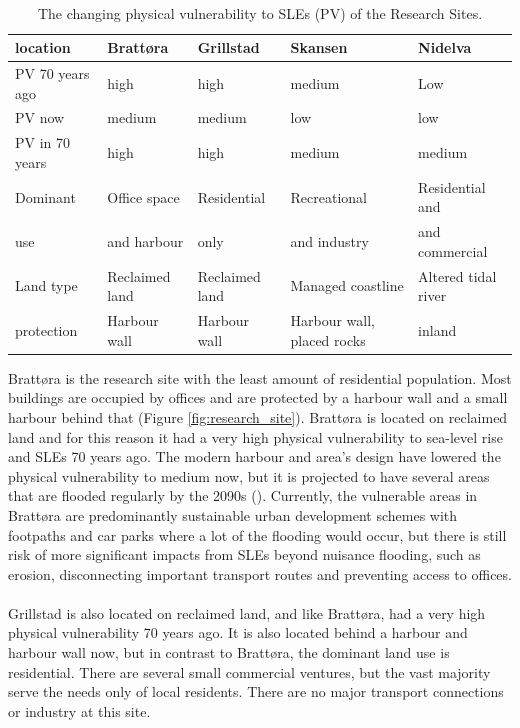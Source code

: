 \paragraph{}
\begin{table}[!ht]
    \centering
    \begin{tabular}{|l|l|l|l|l|}
    \hline
        \textbf{location} & \textbf{Brattøra} & \textbf{Grillstad} & \textbf{Skansen}  & \textbf{Nidelva} \\ \hline
        PV 70 years ago & high & high & medium & Low \\ \hline
        PV now &  medium &  medium &  low &  low \\ \hline
        PV in 70 years &  high &  high &  medium &  medium \\ \hline
        Dominant & Office space  & Residential & Recreational  & Residential and \\ \newline
        use & and harbour &  only   &  and industry & and commercial  \\ \hline
        Land type & Reclaimed land & Reclaimed land & Managed coastline  & Altered tidal river \\ \hline
        protection & Harbour wall & Harbour wall & Harbour wall, placed rocks & inland \\ \hline
    \end{tabular}
    \caption{The changing physical vulnerability to SLEs (PV) of the Research Sites.}
    \label{table:research_site}
\end{table}

Brattøra is the research site with the least amount of residential population. Most buildings are occupied by offices and are protected by a harbour wall and a small harbour behind that (Figure \ref{fig:research_site}). Brattøra is located on reclaimed land and for this reason it had a very high physical vulnerability to sea-level rise and SLEs 70 years ago. The modern harbour and area's design have lowered the physical vulnerability to medium now, but it is projected to have several areas that are flooded regularly by the 2090s (\cite{kartverket_se_2020}). Currently, the vulnerable areas in Brattøra are predominantly sustainable urban development schemes with footpaths and car parks where a lot of the flooding would occur, but there is still risk of more significant impacts from SLEs beyond nuisance flooding, such as erosion, disconnecting important transport routes and preventing access to offices.
\paragraph{}
Grillstad is also located on reclaimed land, and like Brattøra, had a very high physical vulnerability 70 years ago. It is also located behind a harbour and harbour wall now, but in contrast to  Brattøra, the dominant land use is residential. There are several small commercial ventures, but the vast majority serve the needs only of local residents. There are no major transport connections or industry at this site. 
